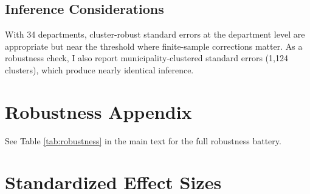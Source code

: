 \documentclass[12pt]{article}
\begin{document}
\subsection{Inference Considerations}

With 34 departments, cluster-robust standard errors at the department level are appropriate but near the threshold where finite-sample corrections matter. As a robustness check, I also report municipality-clustered standard errors (1,124 clusters), which produce nearly identical inference.


\section{Robustness Appendix}

See Table \ref{tab:robustness} in the main text for the full robustness battery.


\section{Standardized Effect Sizes}
\label{sec:sde}


\end{document}
